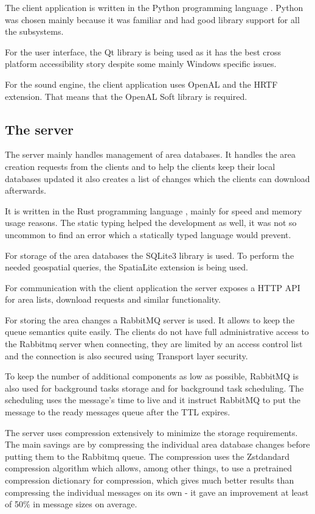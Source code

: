 \documentclass[nolof,digital]{fithesis3}
\begin{document}
The client application is written in the Python programming language \parencite{python}. Python was chosen mainly because it was familiar and had good library support for all the subsystems.

For the user interface, the Qt library \parencite{qt} is being used as it has the best cross platform accessibility story despite some mainly Windows specific issues.

For the sound engine, the client application uses OpenAL and the HRTF extension. That means that the OpenAL Soft library \parencite{openalsoft} is required.
\subsection{The server}
The server mainly handles management of area databases. It handles the area creation requests from the clients and to help the clients keep their local databases updated it also creates a list of changes which the clients can download afterwards.

It is written in the Rust programming language \parencite{rust}, mainly for speed and memory usage reasons. The static typing helped the development as well, it was not so uncommon to find an error which a statically typed language would prevent.

For storage of the area databases the SQLite3 library \parencite{sqlite} is used. To perform the needed geospatial queries, the SpatiaLite extension \parencite{spatialite} is being used.

For communication with the client application the server exposes a HTTP API for area lists, download requests and similar functionality. 

For storing the area changes a RabbitMQ \parencite{rabbitmq} server is used. It allows to keep the queue semantics quite easily. The clients do not have full administrative access to the Rabbitmq server when connecting, they are limited by an access control list and the connection is also secured using Transport layer security.

To keep the number of additional components as low as possible, RabbitMQ is also used for background tasks storage and for background task scheduling. The scheduling uses the message's time to live and it instruct RabbitMQ to put the message to the ready messages queue after the TTL expires.

The server uses compression extensively to minimize the storage requirements. The main savings are by compressing the individual area database changes before putting them to the Rabbitmq queue. The compression uses the Zstdandard compression algorithm \parencite{zstd} which allows, among other things, to use a pretrained compression dictionary for compression, which gives much better results than compressing the individual messages on its own - it gave an improvement at least of 50\% in message sizes on average.
\end{document}
